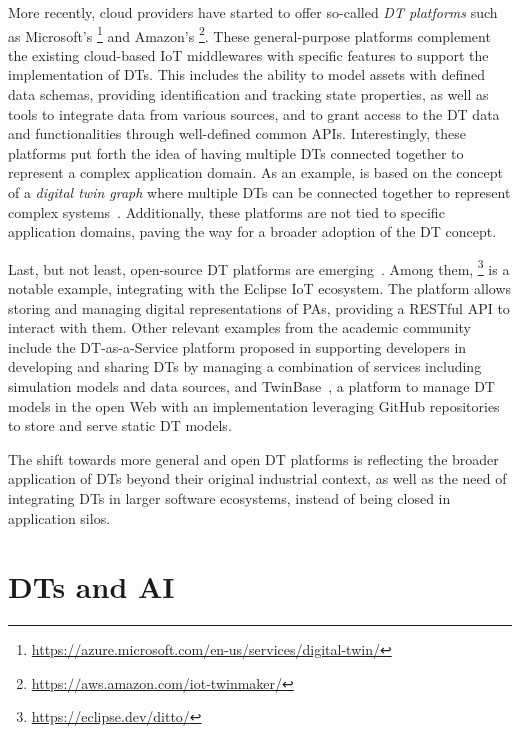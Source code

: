 More recently, cloud providers have started to offer so-called \emph{\ac{DT} platforms} such as Microsoft's \azureTwin{}\footnote{\url{https://azure.microsoft.com/en-us/services/digital-twin/}} and Amazon's \awsTwin{}\footnote{\url{https://aws.amazon.com/iot-twinmaker/}}.
%
These general-purpose platforms complement the existing cloud-based \ac{IoT} middlewares with specific features to support the implementation of \acp{DT}. 
This includes the ability to model assets with defined data schemas, providing identification and tracking state properties,
as well as tools to integrate data from various sources, and to grant access to the \ac{DT} data and functionalities through well-defined common \acp{API}.
%
Interestingly, these platforms put forth the idea of having multiple \acp{DT} connected together to represent a complex application domain. 
%
As an example, \azureTwin{} is based on the concept of a \emph{digital twin graph} where multiple \acp{DT} can be connected together to represent complex systems~\cite{Meijers_2022}.
%
Additionally, these platforms are not tied to specific application domains, paving the way for a broader adoption of the \ac{DT} concept. 

Last, but not least, open-source \ac{DT} platforms are emerging~\cite{Gil_Mikkelsen_Gomes_Larsen_2024}.
Among them, \ditto{}\footnote{\url{https://eclipse.dev/ditto/}} is a notable example, integrating with the Eclipse \ac{IoT} ecosystem. 
%
The platform allows storing and managing digital representations of \acp{PA}, providing a RESTful \ac{API} to interact with them. 
%
Other relevant examples from the academic community include
the \ac{DT}-as-a-Service platform proposed in \cite{Talasila_Gomes_Mikkelsen_Arboleda_Kamburjan_Larsen_2023} supporting developers in developing and sharing \acp{DT} by managing a combination of services including simulation models and data sources,
and TwinBase~\cite{Autiosalo_Siegel_Tammi_2021}, a platform to manage \ac{DT} models in the open Web with an implementation leveraging GitHub repositories to store and serve static \ac{DT} models.

The shift towards more general and open \ac{DT} platforms is reflecting the broader application of \acp{DT} beyond their original industrial context, as well as the need of integrating \acp{DT} in larger software ecosystems, instead of being closed in application silos. 

\section{\aclp{DT} and \acl{AI}}
\label{sec:back:dt:ai}

